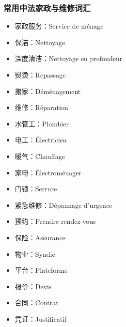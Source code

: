 \subsubsection{常用中法家政与维修词汇}
\begin{itemize}
    \item 家政服务：Service de ménage
    \item 保洁：Nettoyage
    \item 深度清洁：Nettoyage en profondeur
    \item 熨烫：Repassage
    \item 搬家：Déménagement
    \item 维修：Réparation
    \item 水管工：Plombier
    \item 电工：Électricien
    \item 暖气：Chauffage
    \item 家电：Électroménager
    \item 门锁：Serrure
    \item 紧急维修：Dépannage d’urgence
    \item 预约：Prendre rendez-vous
    \item 保险：Assurance
    \item 物业：Syndic
    \item 平台：Plateforme
    \item 报价：Devis
    \item 合同：Contrat
    \item 凭证：Justificatif
\end{itemize}
